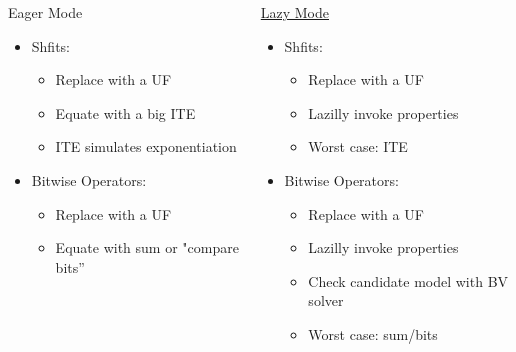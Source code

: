 \documentclass[t,aspectratio=43,9pt,bookmarks=false,dvipsnames,table]{beamer}
\begin{document}
\begin{frame}[t]
  \begin{block}{}
  \begin{columns}
  \begin{alertblock}{Eager Mode}
      \begin{itemize}
      \item Shfits:
        \begin{itemize}
          \item Replace with a UF
          \item Equate with a big ITE
          \item ITE simulates exponentiation
        \end{itemize}
      \item Bitwise Operators:
        \begin{itemize}
            \item Replace with a UF
            \item Equate with sum or "compare bits''
         \end{itemize}
      \end{itemize}
  \end{alertblock}
  \begin{alertblock}{\underline{Lazy Mode}}
    \begin{itemize}
      \item Shfits:
        \begin{itemize}
          \item Replace with a UF
          \item Lazilly invoke properties
          \item Worst case: ITE
        \end{itemize}
      \item Bitwise Operators:
        \begin{itemize}
        \item Replace with a UF
        \item Lazilly invoke properties
        \item Check candidate model with BV solver
        \item Worst case: sum/bits
        \end{itemize}
                \end{itemize}
  \end{alertblock}
  \end{columns}
\end{block}
\end{frame}
\end{document}
